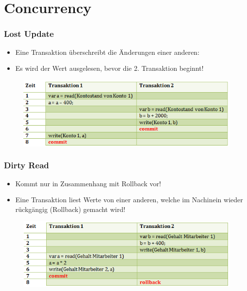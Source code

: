 \section{Concurrency}
\subsubsection{Lost Update}
\begin{itemize}
    \item Eine Transaktion überschreibt die Änderungen einer anderen:
    \item Es wird der Wert ausgelesen, bevor die 2. Transaktion beginnt!
\end{itemize}
\begin{figure}[H]
    \centering
    \includegraphics{res/themenkorb_5/lostupdate.png}
\end{figure}
\subsubsection{Dirty Read}
\begin{itemize}
    \item Kommt nur in Zusammenhang mit Rollback vor!
    \item Eine Transaktion liest Werte von einer anderen, welche im Nachinein wieder rückgängig (Rollback) gemacht wird!
\end{itemize}
\begin{figure}[H]
    \centering
    \includegraphics{res/themenkorb_5/dirtyread.png}
\end{figure}

